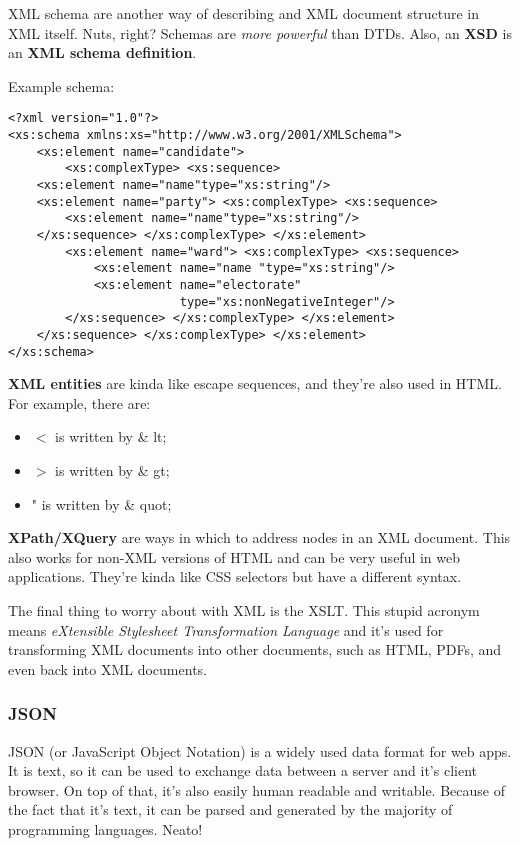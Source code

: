 \documentclass[11pt,a4paper,titlepage,dvipsnames,cmyk]{scrartcl}
\begin{document}
XML schema are another way of describing and XML document structure in XML
itself. Nuts, right? Schemas are \textit{more powerful} than DTDs. Also,
an \textbf{XSD} is an \textbf{XML schema definition}.

Example schema:
\begin{lstlisting}[]
<?xml version="1.0"?>
<xs:schema xmlns:xs="http://www.w3.org/2001/XMLSchema">
    <xs:element name="candidate">
        <xs:complexType> <xs:sequence>
    <xs:element name="name"type="xs:string"/>
    <xs:element name="party"> <xs:complexType> <xs:sequence>
        <xs:element name="name"type="xs:string"/>
    </xs:sequence> </xs:complexType> </xs:element>
        <xs:element name="ward"> <xs:complexType> <xs:sequence>
            <xs:element name="name "type="xs:string"/>
            <xs:element name="electorate"
                        type="xs:nonNegativeInteger"/>
        </xs:sequence> </xs:complexType> </xs:element>
    </xs:sequence> </xs:complexType> </xs:element>
</xs:schema>
\end{lstlisting}

\textbf{XML entities} are kinda like escape sequences, and they're also
used in HTML. For example, there are:
\begin{itemize}
    \item $<$ is written by \& lt;
    \item $>$ is written by \& gt;
    \item " is written by \& quot;
\end{itemize}

\textbf{XPath/XQuery} are ways in which to address nodes in an XML
document. This also works for non-XML versions of HTML and can be very
useful in web applications. They're kinda like CSS selectors but have a
different syntax.

The final thing to worry about with XML is the XSLT. This stupid acronym
means \textit{eXtensible Stylesheet Transformation Language} and it's used
for transforming XML documents into other documents, such as HTML, PDFs,
and even back into XML documents.

\subsubsection{JSON}%
\label{ssub:JSON}
JSON (or JavaScript Object Notation) is a widely used data format for web
apps. It is text, so it can be used to exchange data between a server and
it's client browser. On top of that, it's also easily human readable and
writable. Because of the fact that it's text, it can be parsed and
generated by the majority of programming languages. Neato!
\end{document}
